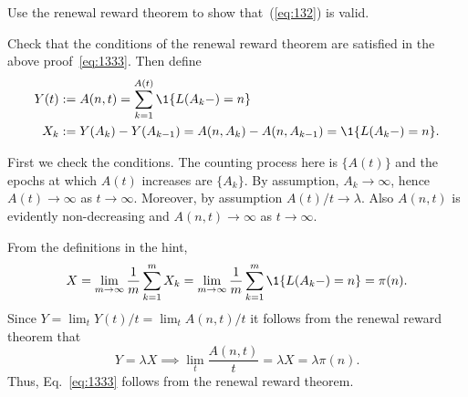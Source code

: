 \begin{exercise}
Use the renewal reward theorem to show that~(\ref{eq:132}) is valid.
\begin{hint}
Check that the conditions of the renewal reward theorem are satisfied in the above proof~\eqref{eq:1333}. Then define  
\begin{align*}
  Y(t) &:= A(n,t) = \sum_{k=1}^{A(t)} \1{L(A_k-) = n} \\
X_k &:= Y(A_k) - Y(A_{k-1}) = A(n, A_k) - A(n, A_{k-1}) = \1{L(A_k-)=n}.
\end{align*}

\end{hint}
\begin{solution}
First we check the conditions.  The counting process here is $\{A(t)\}$ and the epochs at which
    $A(t)$ increases are $\{A_k\}$. By assumption, $A_k\to\infty$,
    hence $A(t)\to\infty$ as $t\to\infty$. Moreover, by assumption
    $A(t)/t \to \lambda$. Also $A(n,t)$ is evidently non-decreasing and
    $A(n,t)\to\infty$ as $t\to\infty$.


From the definitions in the hint,   
\begin{equation*}
X= \lim_{m\to\infty} \frac 1 m \sum_{k=1}^m X_k =\lim_{m\to\infty} \frac 1 m \sum_{k=1}^m \1{L(A_k-)=n} = \pi(n).
\end{equation*}
Since $Y=\lim_t Y(t)/t = \lim_t A(n,t)/t$ it follows from the renewal reward theorem that
\begin{equation*}
  Y=\lambda X \implies \lim_t \frac{A(n,t)} t = \lambda X = \lambda \pi(n).
\end{equation*}
Thus, Eq.~\eqref{eq:1333} follows from the renewal reward theorem.
\end{solution}
\end{exercise}








